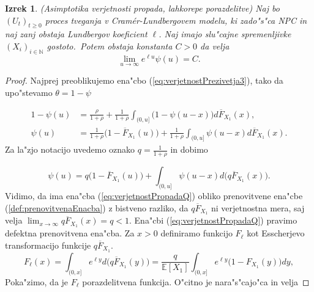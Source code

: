 \documentclass[12pt, a4paper, reqno]{amsart}
\theoremstyle{definition}
\theoremstyle{plain}
\newtheorem{izrek}[definicija]{Izrek}
\newcommand{\N}{\mathbb{N}}
\newcommand{\E}{\mathbb{E}}
\newcommand{\1}{\mathds{1}}
\begin{document}
            \begin{izrek}(Asimptotika verjetnosti propada, lahkorepe porazdelitve)
                Naj bo $(U_t)_{t\geq0}$ proces tveganja v Cramér-Lundbergovem modelu, ki zado"s"ca NPC in 
                naj zanj obstaja Lundbergov koeficient $\ell$. Naj imajo slu"cajne spremenljivke 
                $(X_i)_{i\in\N}$ gostoto.\ Potem obstaja konstanta $C>0$ da
                velja 
                \begin{equation*}
                    \lim_{u\to\infty}e^{\ell u}\psi(u) = C.
                \end{equation*}
                \label{izr:CramerjevaMeja}
            \end{izrek}

            \begin{proof} 
                Najprej preoblikujemo ena"cbo (\ref{eq:verjetnostPrezivetja3}), tako da 
                upo"stevamo $\theta = 1 - \psi$

                \begin{align*}
                    1 - \psi(u) &= \frac{\rho}{1 + \rho} + \frac{1}{1 + \rho}\int_{(0, u]}\bigl(1 - \psi(u - x)\bigr)d\overline{F}_{X_1}(x), \\
                    \psi(u) &= \frac{1}{1 + \rho}\bigl(1 - \overline{F}_{X_1}(u)\bigr) + \frac{1}{1 + \rho}\int_{(0, u]}\psi(u - x)d\overline{F}_{X_1}(x).
                \end{align*}
                Za la"zjo notacijo uvedemo oznako $q = \frac{1}{1 + \rho}$ in dobimo

                \begin{equation}
                    \psi(u) = q\bigl(1 - \overline{F}_{X_1}(u)\bigr) + \int_{(0, u]}\psi(u - x)d\bigl(q\overline{F}_{X_1}(x)\bigr).
                    \label{eq:verjetnostPropadaQ}
                \end{equation}
                Vidimo, da ima ena"cba (\ref{eq:verjetnostPropadaQ}) obliko prenovitvene 
                ena"cbe (\ref{def:prenovitvenaEnacba}) z bistveno razliko, da $q\overline{F}_{X_1}$ ni
                verjetnostna mera, saj velja $\lim_{x\to\infty}q\overline{F}_{X_1}(x) = q < 1$. Ena"cbi 
                (\ref{eq:verjetnostPropadaQ}) pravimo defektna prenovitvena ena"cba. Za $x > 0$ 
                definiramo funkcijo $F_\ell$ kot Esscherjevo transformacijo funkcije $q\overline{F}_{X_1}$.
                \begin{equation*}
                    F_\ell(x) = \int_{(0, x]}e^{\ell y}d\bigl(q\overline{F}_{X_1}(y)\bigr) = \frac{q}{\E\left[X_1\right]}\int_{(0, x]}e^{\ell y}\bigl(1 - F_{X_1}(y)\bigr)dy, 
                \end{equation*}
                Poka"zimo, da je $F_\ell$ porazdelitvena funkcija. O"citno je nara"s"cajo"ca in velja


\end{proof}
\end{document}
